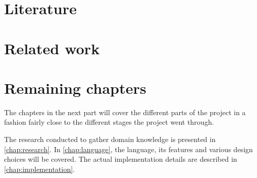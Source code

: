 \section{Literature}


\section{Related work}


\section{Remaining chapters}
The chapters in the next part will cover the different parts of the
project in a fashion fairly close to the different stages the project
went through.

The research conducted to gather domain knowledge is presented in
\autoref{chap:research}. In \autoref{chap:language}, the language, its
features and various design choices will be covered. The actual
implementation details are described in \autoref{chap:implementation}.
